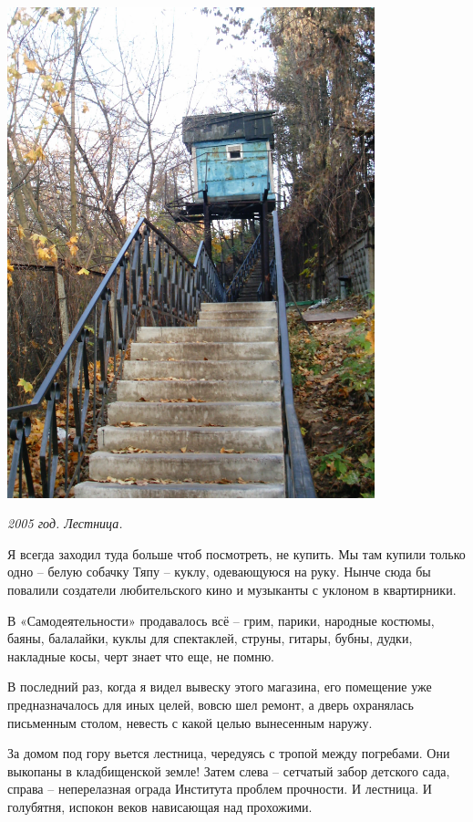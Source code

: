 \begin{center}
\includegraphics[width=0.80\textwidth]{chast-vosp/zver/imag0017.jpg}

\textit{2005 год. Лестница.}
\end{center}

\newpage

Я всегда заходил туда больше чтоб посмотреть, не купить. Мы там купили только одно – белую собачку Тяпу – куклу, одевающуюся на руку. Нынче сюда бы повалили создатели любительского кино и музыканты с уклоном в квартирники. 

В «Самодеятельности» продавалось всё – грим, парики, народные костюмы, баяны, балалайки, куклы для спектаклей, струны, гитары, бубны, дудки, накладные косы, черт знает что еще, не помню. 

В последний раз, когда я видел вывеску этого магазина, его помещение уже предназначалось для иных целей, вовсю шел ремонт, а дверь охранялась письменным столом, невесть с какой целью вынесенным наружу.

За домом под гору вьется лестница, чередуясь с тропой между погребами. Они выкопаны в кладбищенской земле! Затем слева – сетчатый забор детского сада, справа – неперелазная ограда Института проблем прочности. И лестница. И голубятня, испокон веков нависающая над прохожими. 

